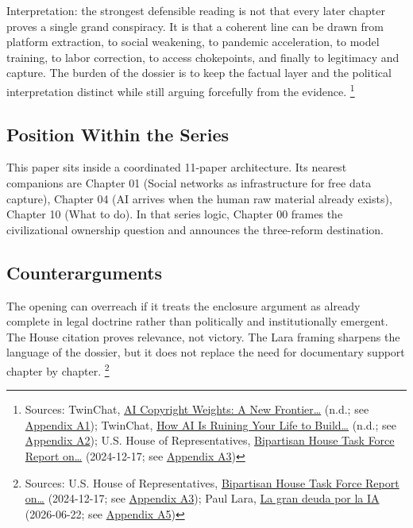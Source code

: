 \documentclass[
  american,
  11pt,
  letterpaper,
]{article}
\begin{document}
Interpretation: the strongest defensible reading is not that every later
chapter proves a single grand conspiracy. It is that a coherent line can
be drawn from platform extraction, to social weakening, to pandemic
acceleration, to model training, to labor correction, to access
chokepoints, and finally to legitimacy and capture. The burden of the
dossier is to keep the factual layer and the political interpretation
distinct while still arguing forcefully from the evidence. \footnote{Sources:
  TwinChat,
  \href{https://medium.com/twinchat/ai-copyright-weights-a-new-frontier-in-intellectual-property-law-d8ee1b6c55ee}{AI
  Copyright Weights: A New Frontier\ldots{}} (n.d.; see
  \hyperref[appendix-a1-ai-copyright-weights-a-new-frontier-in-intellectual-property-law]{Appendix
  A1}); TwinChat,
  \href{https://medium.com/twinchat/how-ai-is-ruining-your-life-to-build-an-empire-8b6d02e55bc9}{How
  AI Is Ruining Your Life to Build\ldots{}} (n.d.; see
  \hyperref[appendix-a2-how-ai-is-ruining-your-life-to-build-an-empire]{Appendix
  A2}); U.S. House of Representatives,
  \href{https://www.speaker.gov/wp-content/uploads/2024/12/AI-Task-Force-Report-FINAL.pdf}{Bipartisan
  House Task Force Report on\ldots{}} (2024-12-17; see
  \hyperref[appendix-a3-bipartisan-house-task-force-report-on-artificial-intelligence]{Appendix
  A3})}

\subsection{Position Within the
Series}\label{position-within-the-series}

This paper sits inside a coordinated 11-paper architecture. Its nearest
companions are Chapter 01 (Social networks as infrastructure for free
data capture), Chapter 04 (AI arrives when the human raw material
already exists), Chapter 10 (What to do). In that series logic, Chapter
00 frames the civilizational ownership question and announces the
three-reform destination.

\subsection{Counterarguments}\label{counterarguments}

The opening can overreach if it treats the enclosure argument as already
complete in legal doctrine rather than politically and institutionally
emergent. The House citation proves relevance, not victory. The Lara
framing sharpens the language of the dossier, but it does not replace
the need for documentary support chapter by chapter. \footnote{Sources:
  U.S. House of Representatives,
  \href{https://www.speaker.gov/wp-content/uploads/2024/12/AI-Task-Force-Report-FINAL.pdf}{Bipartisan
  House Task Force Report on\ldots{}} (2024-12-17; see
  \hyperref[appendix-a3-bipartisan-house-task-force-report-on-artificial-intelligence]{Appendix
  A3}); Paul Lara,
  \href{https://www.dineroenimagen.com/paul-lara/la-gran-deuda-por-la-ia/186930}{La
  gran deuda por la IA} (2026-06-22; see
  \hyperref[appendix-a5-la-gran-deuda-por-la-ia]{Appendix A5})}
\end{document}
